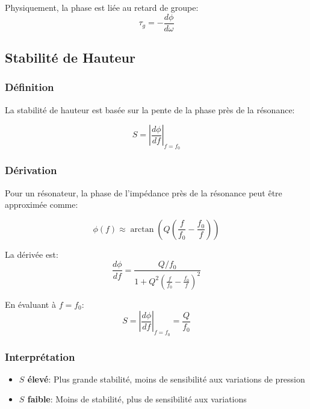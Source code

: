 \documentclass[12pt,a4paper,twocolumn]{article}
\newcommand{\freqzero}{f_0}
\begin{document}
Physiquement, la phase est liée au retard de groupe:
\begin{equation}
\tau_g = -\frac{d\phi}{d\omega}
\label{eq:retard_groupe}
\end{equation}

\subsection{Stabilité de Hauteur}

\subsubsection{Définition}

La stabilité de hauteur est basée sur la pente de la phase près de la résonance:

\begin{equation}
S = \left|\frac{d\phi}{df}\right|_{f=\freqzero}
\label{eq:pitch_stability}
\end{equation}

\subsubsection{Dérivation}

Pour un résonateur, la phase de l'impédance près de la résonance peut être approximée comme:

\begin{equation}
\phi(f) \approx \arctan\left(Q\left(\frac{f}{\freqzero} - \frac{\freqzero}{f}\right)\right)
\label{eq:phase_approximation}
\end{equation}

La dérivée est:
\begin{equation}
\frac{d\phi}{df} = \frac{Q/\freqzero}{1 + Q^2\left(\frac{f}{\freqzero} - \frac{\freqzero}{f}\right)^2}
\label{eq:derivee_phase}
\end{equation}

En évaluant à $f = \freqzero$:
\begin{equation}
S = \left|\frac{d\phi}{df}\right|_{f=\freqzero} = \frac{Q}{\freqzero}
\label{eq:stabilite_final}
\end{equation}

\subsubsection{Interprétation}

\begin{itemize}
    \item \textbf{$S$ élevé}: Plus grande stabilité, moins de sensibilité aux variations de pression
    \item \textbf{$S$ faible}: Moins de stabilité, plus de sensibilité aux variations
\end{itemize}
\end{document}
